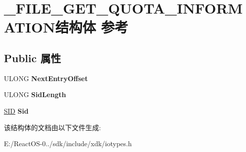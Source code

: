 \hypertarget{struct___f_i_l_e___g_e_t___q_u_o_t_a___i_n_f_o_r_m_a_t_i_o_n}{}\section{\+\_\+\+F\+I\+L\+E\+\_\+\+G\+E\+T\+\_\+\+Q\+U\+O\+T\+A\+\_\+\+I\+N\+F\+O\+R\+M\+A\+T\+I\+O\+N结构体 参考}
\label{struct___f_i_l_e___g_e_t___q_u_o_t_a___i_n_f_o_r_m_a_t_i_o_n}
\subsection*{Public 属性}
\begin{DoxyCompactItemize}
\item 
\mbox{\label{struct___f_i_l_e___g_e_t___q_u_o_t_a___i_n_f_o_r_m_a_t_i_o_n_a926860a0682bc6aa65442e58786f9170}} 
U\+L\+O\+NG {\bfseries Next\+Entry\+Offset}
\item 
\mbox{\label{struct___f_i_l_e___g_e_t___q_u_o_t_a___i_n_f_o_r_m_a_t_i_o_n_a4367a6d58f3b1901d1f1d99df91496ed}} 
U\+L\+O\+NG {\bfseries Sid\+Length}
\item 
\mbox{\label{struct___f_i_l_e___g_e_t___q_u_o_t_a___i_n_f_o_r_m_a_t_i_o_n_a78b4a2888301081d675c2d1f22b6cce2}} 
\hyperlink{struct___s_i_d}{S\+ID} {\bfseries Sid}
\end{DoxyCompactItemize}


该结构体的文档由以下文件生成\+:\begin{DoxyCompactItemize}
\item 
E\+:/\+React\+O\+S-\/0../sdk/include/xdk/iotypes.\+h\end{DoxyCompactItemize}
